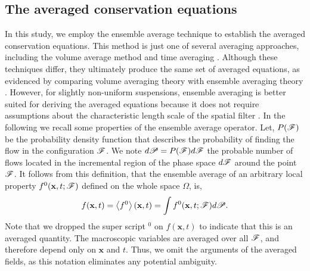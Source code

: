 \subsection{The averaged conservation equations}
\label{sec:avg_def}
In this study, we employ the ensemble average technique to establish the averaged conservation equations. 
This method is just one of several averaging approaches, including the volume average method \citep{jackson1997locally} and time averaging \citep{ishii2010thermo}. 
Although these techniques differ, they ultimately produce the same set of averaged equations, as evidenced by comparing volume averaging theory with ensemble averaging theory \citep{jackson1997locally,zhang1997momentum}. However, for slightly non-uniform suspensions, ensemble averaging is better suited for deriving the averaged equations because it does not require assumptions about the characteristic length scale of the spatial filter \citep{lhuillier1992ensemble}.
In the following we recall some properties of the ensemble average operator. 
Let, $P(\mathscr{F})$ be the probability density function that describes the probability of finding the flow in the configuration $\mathscr{F}$. 
We note $d\mathscr{P} = P(\mathscr{F}) d\mathscr{F}$ the probable number of flows located in the incremental region of the phase space $d\mathscr{F}$ around the point $\mathscr{F}$. 
It follows from this definition, that the ensemble average of an arbitrary local property $f^0(\textbf{x},t;\mathscr{F})$ defined on the whole space $\Omega$, is,
\begin{equation}
    f(\textbf{x},t)
    = \avg{f^0}(\textbf{x},t)
    =\int f^0(\textbf{x},t;\FF) d\mathscr{P}. 
    \label{eq:avg}
\end{equation}  
Note that we dropped the super script $^0$ on $f(\textbf{x},t)$ to indicate that this is an averaged quantity. 
The macroscopic variables are averaged over all $\mathscr{F}$, and therefore depend only on $\textbf{x}$ and $t$.
Thus, we omit the arguments of the averaged fields, as this notation eliminates any potential ambiguity. 

